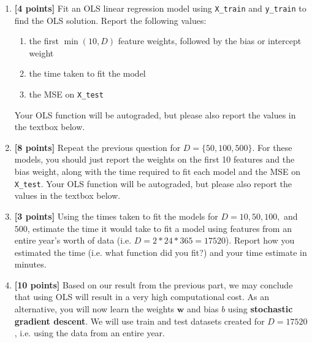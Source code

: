 \begin{enumerate}
    \item \textbf{[4 points]} Fit an OLS linear regression model using \texttt{X\_train} and \texttt{y\_train} to find the OLS solution. Report the following values:
    \begin{enumerate}
        \item the first $\min(10,D)$ feature weights, followed by the bias or intercept weight
        \item the time taken to fit the model
        \item the MSE on \texttt{X\_test}
    \end{enumerate}
    Your OLS function will be autograded, but please also report the values in the textbox below. 
    
    \begin{tcolorbox}[fit,height=5cm, width=0.95\textwidth, blank, borderline={1pt}{-2pt}]

    \end{tcolorbox}

    \newpage
    
    \item \textbf{[8 points]} Repeat the previous question for $D=\{50, 100, 500\}$. For these models, you should just report the weights on the first 10 features and the bias weight, along with the time required to fit each model and the MSE on \texttt{X\_test}. Your OLS function will be autograded, but please also report the values in the textbox below.
    \begin{tcolorbox}[fit,height=7cm, width=0.95\textwidth, blank, borderline={1pt}{-2pt}]

    \end{tcolorbox}
    
    \item \textbf{[3 points]} Using the times taken to fit the models for $D=10, 50, 100,$ and $500$, estimate the time it would take to fit a model using features from an entire year's worth of data (i.e. $D = 2 * 24 * 365 = 17520$). Report how you estimated the time (i.e. what function did you fit?) and your time estimate in minutes.
    \begin{tcolorbox}[fit,height=3cm, width=0.95\textwidth, blank, borderline={1pt}{-2pt}]

    \end{tcolorbox}

    \clearpage
    
    \item \textbf{[10 points]} Based on our result from the previous part, we may conclude that using OLS will result in a very high computational cost. As an alternative, you will now learn the weights $\mathbf{w}$ and bias $b$ using \textbf{stochastic gradient descent}. We will use train and test datasets created for $D=17520$, i.e. using the data from an entire year.


\end{enumerate}
